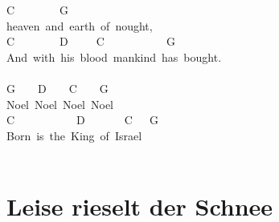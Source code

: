 \documentclass[]{book}
\let\stdsection\section
\renewcommand\section{\clearpage\stdsection}
\begin{document}
\hspace*{0.333em}\hspace*{0.333em}\hspace*{0.333em}\hspace*{0.333em}\hspace*{0.333em}\hspace*{0.333em}\hspace*{0.333em}\hspace*{0.333em}\hspace*{0.333em}\hspace*{0.333em}\hspace*{0.333em}C~~~~~~~~G~\\
heaven~and~earth~of~nought,\\
\hspace*{0.333em}\hspace*{0.333em}\hspace*{0.333em}\hspace*{0.333em}C~~~~~~~~D~~~~~C~~~~~~~~~~~G~~\\
And~with~his~blood~mankind~has~bought.~\\
~\\
\hspace*{0.333em}\hspace*{0.333em}G~~~~D~~~~C~~~~G\\
Noel~Noel~Noel~Noel\\
C~~~~~~~~~~~D~~~~~~~C~~~G\\
Born~is~the~King~of~Israel\\
~\\

\hypertarget{leise-rieselt-der-schnee}{%
\section{Leise rieselt der Schnee}\label{leise-rieselt-der-schnee}}
\end{document}
